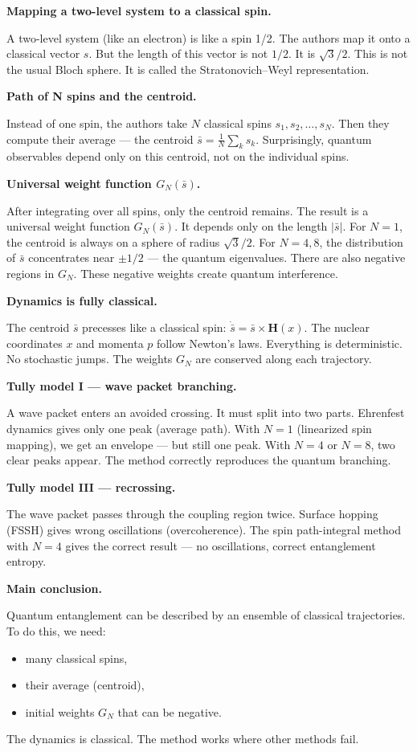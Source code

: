 \documentclass[a4paper,12pt]{article}
\begin{document}
	\textbf{Mapping a two-level system to a classical spin.}
	
	A two-level system (like an electron) is like a spin 1/2. 
	The authors map it onto a classical vector \(s\). 
	But the length of this vector is not \(1/2\). It is \(\sqrt{3}/2\). 
	This is not the usual Bloch sphere. It is called the Stratonovich–Weyl representation.
	
	\textbf{Path of N spins and the centroid.}
	
	Instead of one spin, the authors take \(N\) classical spins 
	\(s_1, s_2, \dots, s_N\). 
	Then they compute their average — the centroid \(\bar{s} = \frac{1}{N}\sum_k s_k\). 
	Surprisingly, quantum observables depend only on this centroid, 
	not on the individual spins.
	
	\textbf{Universal weight function \(G_N(\bar{s})\).}
	
	After integrating over all spins, only the centroid remains. 
	The result is a universal weight function \(G_N(\bar{s})\). 
	It depends only on the length \(|\bar{s}|\). 
	For \(N=1\), the centroid is always on a sphere of radius \(\sqrt{3}/2\). 
	For \(N=4,8\), the distribution of \(\bar{s}\) concentrates near \(\pm 1/2\) — 
	the quantum eigenvalues. 
	There are also negative regions in \(G_N\). 
	These negative weights create quantum interference.
	
	\textbf{Dynamics is fully classical.}
	
	The centroid \(\bar{s}\) precesses like a classical spin: 
	\(\dot{\bar{s}} = \bar{s} \times \mathbf{H}(x)\). 
	The nuclear coordinates \(x\) and momenta \(p\) follow Newton's laws. 
	Everything is deterministic. 
	No stochastic jumps. 
	The weights \(G_N\) are conserved along each trajectory.
	
	\textbf{Tully model I — wave packet branching.}
	
	A wave packet enters an avoided crossing. 
	It must split into two parts. 
	Ehrenfest dynamics gives only one peak (average path). 
	With \(N=1\) (linearized spin mapping), we get an envelope — but still one peak. 
	With \(N=4\) or \(N=8\), two clear peaks appear. 
	The method correctly reproduces the quantum branching.
	
	\textbf{Tully model III — recrossing.}
	
	The wave packet passes through the coupling region twice. 
	Surface hopping (FSSH) gives wrong oscillations (overcoherence). 
	The spin path-integral method with \(N=4\) gives the correct result — 
	no oscillations, correct entanglement entropy.
	
	\textbf{Main conclusion.}
	
	Quantum entanglement can be described by an ensemble of classical trajectories. 
	To do this, we need:
	\begin{itemize}
		\item many classical spins,
		\item their average (centroid),
		\item initial weights \(G_N\) that can be negative.
	\end{itemize}
	The dynamics is classical. 
	The method works where other methods fail.
	
\end{document}

